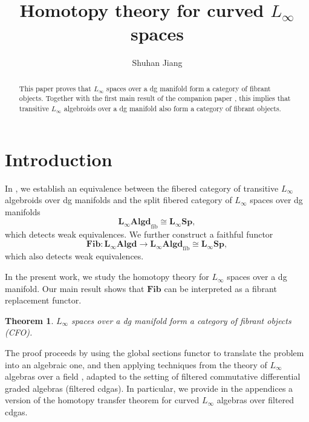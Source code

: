 \documentclass[12pt]{amsart}
\title{Homotopy theory for curved $L_\infty$ spaces}
\author{Shuhan Jiang}
\newtheorem{thm}[defn]{Theorem}
\numberwithin{equation}{section}
\theoremstyle{plain}
\begin{document}
	
	\begin{abstract}
		This paper proves that $L_\infty$ spaces over a dg manifold form a category of fibrant objects. Together with the first main result of the companion paper \cite{cattaneojiang26}, this implies that transitive $L_\infty$ algebroids over a dg manifold also form a category of fibrant objects.
	\end{abstract}
	
	\maketitle
	\setcounter{tocdepth}{1}
	\tableofcontents
	
	
	\section{Introduction}
	
	In \cite{cattaneojiang26}, we establish an equivalence between the fibered category of transitive $L_\infty$ algebroids over dg manifolds and the split fibered category of $L_\infty$ spaces over dg manifolds
	\[
	\mathbf{L_\infty Algd}_{\mathrm{fib}} \cong \mathbf{L_\infty Sp},
	\]
	which detects weak equivalences. We further construct a faithful functor
	\[
	\mathbf{Fib}\colon \mathbf{L_\infty Algd} \longrightarrow \mathbf{L_\infty Algd}_{\mathrm{fib}} \cong \mathbf{L_\infty Sp},
	\]
	which also detects weak equivalences. 
	
	In the present work, we study the homotopy theory for $L_\infty$ spaces over a dg manifold. 
	Our main result shows that $\mathbf{Fib}$ can be interpreted as a fibrant replacement functor.
	\begin{thm}
		$L_\infty$ spaces over a dg manifold form a category of fibrant objects (CFO). 
	\end{thm}
	
	The proof proceeds by using the global sections functor to translate the problem into an algebraic one, and then applying techniques from the theory of $L_\infty$ algebras over a field \cites{getzler2009, rogers2020explicit,rogers2023complete,getzler2025higherholonomycurvedlinftyalgebras}, adapted to the setting of filtered commutative differential graded algebras (filtered cdgas). In particular, we provide in the appendices a version of the homotopy transfer theorem for curved $L_\infty$ algebras over filtered cdgas.
	
\end{document}
